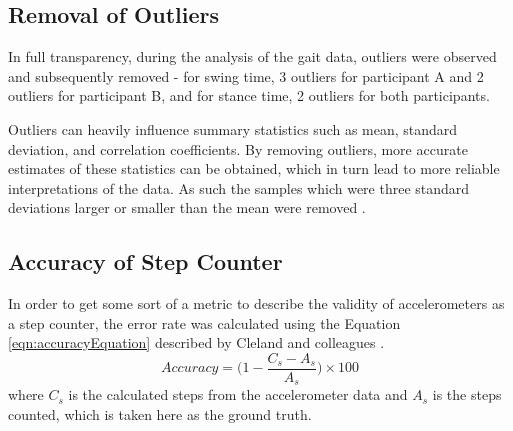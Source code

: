 
\subsection{Removal of Outliers}
In full transparency, during the analysis of the gait data, outliers were observed and subsequently removed - for swing time, 3 outliers for participant A and 2 outliers for participant B, and for stance time, 2 outliers for both participants.

Outliers can heavily influence summary statistics such as mean, standard deviation, and correlation coefficients. By removing outliers, more accurate estimates of these statistics can be obtained, which in turn lead to more reliable interpretations of the data. As such the samples which were three standard deviations larger or smaller than the mean were removed \cite{osborne_power_nodate}.

\subsection{Accuracy of Step Counter}
In order to get some sort of a metric to describe the validity of accelerometers as a step counter, the error rate was calculated using the Equation \eqref{eqn:accuracyEquation} described by Cleland and colleagues \cite{cleland_effects_2012}.
\begin{equation}
	\label{eqn:accuracyEquation}
	Accuracy = \biggl(1 - \frac{C_s - A_s}{A_s}\biggr) \times 100
\end{equation}
where $C_s$ is the calculated steps from the accelerometer data and $A_s$ is the steps counted, which is taken here as the ground truth. 

















